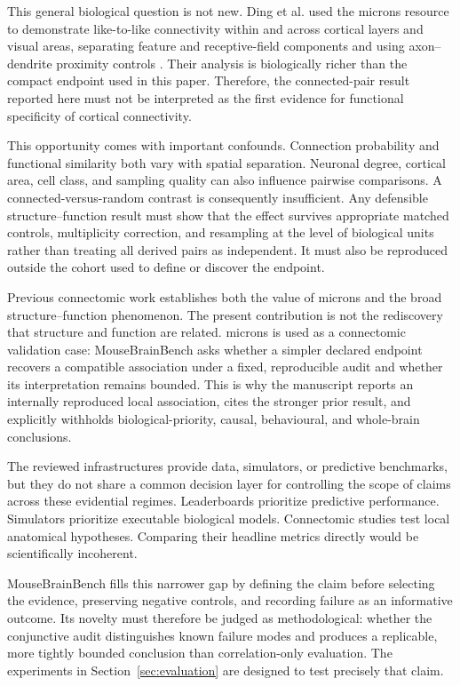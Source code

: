 \documentclass[a4paper,fleqn]{cas-sc}
\begin{document}
This general biological question is not new. Ding et al. used the \acs{microns}
resource to demonstrate like-to-like connectivity within and across cortical
layers and visual areas, separating feature and receptive-field components and
using axon--dendrite proximity controls \citep{ding2025wiring}. Their analysis
is biologically richer than the compact endpoint used in this paper. Therefore,
the connected-pair result reported here must not be interpreted as the first
evidence for functional specificity of cortical connectivity.

This opportunity comes with important confounds. Connection probability and
functional similarity both vary with spatial separation. Neuronal degree,
cortical area, cell class, and sampling quality can also influence pairwise
comparisons. A connected-versus-random contrast is consequently insufficient.
Any defensible structure--function result must show that the effect survives
appropriate matched controls, multiplicity correction, and resampling at the
level of biological units rather than treating all derived pairs as independent.
It must also be reproduced outside the cohort used to define or discover the
endpoint.

Previous connectomic work establishes both the value of \acs{microns} and the broad
structure--function phenomenon. The present contribution is not the rediscovery
that structure and function are related. \acs{microns} is used as a connectomic
validation case: MouseBrainBench asks whether a simpler declared endpoint recovers a
compatible association under a fixed, reproducible audit and whether its
interpretation remains bounded. This is why the manuscript reports an internally reproduced
local association, cites the stronger prior result, and explicitly withholds
biological-priority, causal, behavioural, and whole-brain conclusions.

The reviewed infrastructures provide data, simulators, or predictive
benchmarks, but they do not share a common decision layer for controlling the
scope of claims across these evidential regimes. Leaderboards prioritize
predictive performance. Simulators prioritize executable biological models.
Connectomic studies test local anatomical hypotheses. Comparing their headline
metrics directly would be scientifically incoherent.

MouseBrainBench fills this narrower gap by defining the claim before selecting
the evidence, preserving negative controls, and recording failure as an
informative outcome. Its novelty must therefore be judged as methodological:
whether the conjunctive audit distinguishes known failure modes and produces a
replicable, more tightly bounded conclusion than correlation-only evaluation.
The experiments in Section~\ref{sec:evaluation} are designed to test precisely
that claim.
\end{document}
